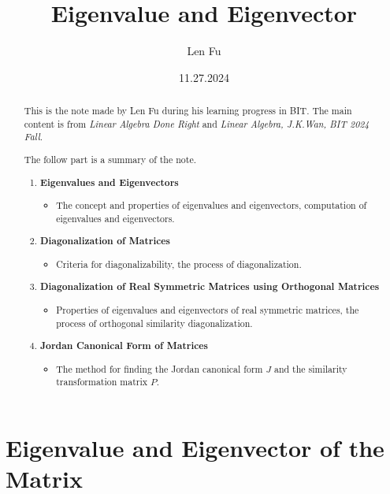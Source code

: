 \documentclass{article}
\title{Eigenvalue and Eigenvector}
\author{Len Fu}
\date{11.27.2024}
\theoremstyle{definition}
\begin{document}
\maketitle


\begin{abstract}
    This is the note made by Len Fu during his learning progress in BIT. The main content is from \textit{Linear Algebra Done Right} and \textit{Linear Algebra, J.K.Wan, BIT 2024 Fall}.
    
    The follow part is a summary of the note.
    \begin{enumerate}
        \item \textbf{Eigenvalues and Eigenvectors}
        \begin{itemize}
            \item The concept and properties of eigenvalues and eigenvectors, computation of eigenvalues and eigenvectors.
        \end{itemize}
        \item \textbf{Diagonalization of Matrices}
        \begin{itemize}
            \item Criteria for diagonalizability, the process of diagonalization.
        \end{itemize}
        \item \textbf{Diagonalization of Real Symmetric Matrices using Orthogonal Matrices}
        \begin{itemize}
            \item Properties of eigenvalues and eigenvectors of real symmetric matrices, the process of orthogonal similarity diagonalization.
        \end{itemize}
        \item \textbf{Jordan Canonical Form of Matrices}
        \begin{itemize}
            \item The method for finding the Jordan canonical form \( J \) and the similarity transformation matrix \( P \).
        \end{itemize}
    \end{enumerate}
\end{abstract}

\tableofcontents

\newpage

\section{Eigenvalue and Eigenvector of the Matrix}
\end{document}
